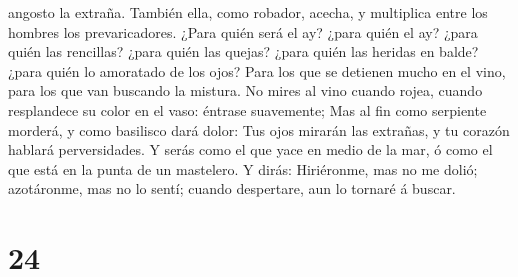 angosto la extraña.  También ella, como robador, acecha, y
multiplica entre los hombres los prevaricadores.  ¿Para
quién será el ay? ¿para quién el ay? ¿para quién las rencillas? ¿para
quién las quejas? ¿para quién las heridas en balde? ¿para quién lo
amoratado de los ojos?  Para los que se detienen mucho en
el vino, para los que van buscando la mistura.  No mires al
vino cuando rojea, cuando resplandece su color en el vaso: éntrase
suavemente;  Mas al fin como serpiente morderá, y como
basilisco dará dolor:  Tus ojos mirarán las extrañas, y tu
corazón hablará perversidades.  Y serás como el que yace en
medio de la mar, ó como el que está en la punta de un mastelero.
 Y dirás: Hiriéronme, mas no me dolió; azotáronme, mas no
lo sentí; cuando despertare, aun lo tornaré á buscar.

\hypertarget{section-23}{%
\section{24}\label{section-23}}

